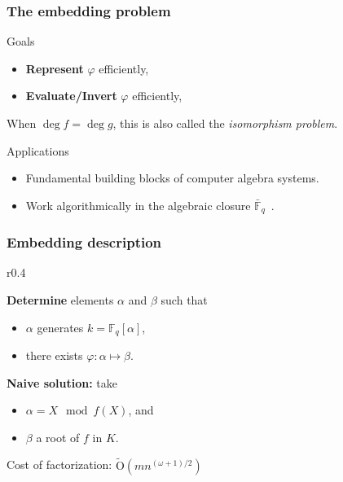 \documentclass[francais]{beamer}
\def\F {\ensuremath{\mathbb{F}}}
\def\tildO {\ensuremath{\mathrm{\tilde{O}}}}
\newcommand{\paragraph}[1]{\smallskip\textbf{#1}}
\begin{document}
\begin{frame}\frametitle{The embedding problem}
  \begin{block}{Goals}
    \begin{itemize}
    \item \textbf{Represent} $\varphi$ efficiently,
    \item \textbf{Evaluate/Invert} $\varphi$ efficiently,
    \end{itemize}

    When $\deg f = \deg g$, this is also called the
    \emph{isomorphism problem}.
  \end{block}

  \begin{block}{Applications}
    \begin{itemize}
    \item Fundamental building blocks of computer algebra systems.
    \item Work algorithmically in the algebraic closure
      $\bar{\F}_q$~\cite{bosma+cannon+steel97}.
    \end{itemize}
  \end{block}
\end{frame}

\begin{frame}\frametitle{Embedding description}
      \begin{wrapfigure}{r}{0.4\textwidth}
      \centering
    \end{wrapfigure}

    \textbf{Determine} elements $\alpha$ and $\beta$ such
    that
    \begin{itemize}
    \item $\alpha$ generates $k=\F_q[\alpha]$,
    \item there exists $\varphi:\alpha\mapsto\beta$.
    \end{itemize}
    \vfill
    \paragraph{Naive solution:} take
    \begin{itemize}
    \item $\alpha= X \mod f(X)$, and
    \item $\beta$ a root of $f$ in $K$.
    \end{itemize}
    Cost of factorization: $\tildO(mn^{(\omega+1)/2})$
\end{frame}
\end{document}
